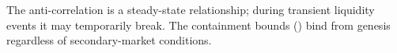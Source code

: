 \documentclass[../main.tex]{subfiles}
\begin{document}
\begin{remark}
    \label{rem:discipline:transient-decorrelation}
    The anti-correlation is a steady-state relationship; during transient liquidity events
    it may temporarily break. The containment bounds () bind from
    genesis regardless of secondary-market conditions.
\end{remark}

\end{document}
